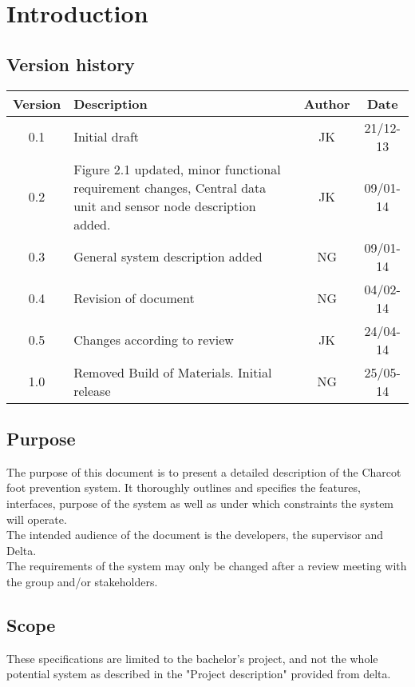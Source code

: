 \chapter{Introduction}
\section{Version history}
\begin{table}[H]
\begin{tabular}{|c|p{9cm}|c|c|}
\hline
Version & Description & Author & Date\\
\hline
0.1 & Initial draft & JK & 21/12-13\\
\hline
0.2 & Figure 2.1 updated, minor functional requirement changes, Central data unit and sensor node description added. & JK & 09/01-14\\
\hline
0.3 & General system description added & NG & 09/01-14\\
\hline
0.4 & Revision of document & NG & 04/02-14\\
\hline
0.5 & Changes according to review & JK & 24/04-14\\
\hline
1.0 & Removed Build of Materials. Initial release & NG & 25/05-14\\
\hline
\end{tabular}
\end{table}

\section{Purpose}
The purpose of this document is to present a detailed description of the Charcot foot prevention system. It thoroughly outlines and specifies the features, interfaces, purpose of the system as well as under which constraints the system will operate.\\
The intended audience of the document is the developers, the supervisor and Delta.\\
The requirements of the system may only be changed after a review meeting with the group and/or stakeholders.\\

\section{Scope}
These specifications are limited to the bachelor's project, and not the whole potential system as described in the "Project description" provided from delta.\\

